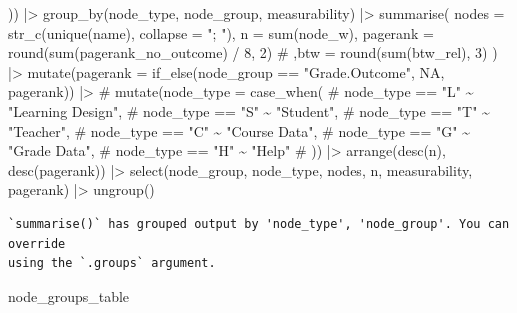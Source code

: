 \documentclass[
  letterpaper,
  DIV=11,
  numbers=noendperiod]{scrartcl}
\newenvironment{Shaded}{\begin{snugshade}}{\end{snugshade}}
\newcommand{\AttributeTok}[1]{\textcolor[rgb]{0.40,0.45,0.13}{#1}}
\newcommand{\CommentTok}[1]{\textcolor[rgb]{0.37,0.37,0.37}{#1}}
\newcommand{\ConstantTok}[1]{\textcolor[rgb]{0.56,0.35,0.01}{#1}}
\newcommand{\DecValTok}[1]{\textcolor[rgb]{0.68,0.00,0.00}{#1}}
\newcommand{\FunctionTok}[1]{\textcolor[rgb]{0.28,0.35,0.67}{#1}}
\newcommand{\NormalTok}[1]{\textcolor[rgb]{0.00,0.23,0.31}{#1}}
\newcommand{\SpecialCharTok}[1]{\textcolor[rgb]{0.37,0.37,0.37}{#1}}
\newcommand{\StringTok}[1]{\textcolor[rgb]{0.13,0.47,0.30}{#1}}
\begin{document}
\begin{Shaded}
\begin{Highlighting}[]
\NormalTok{    )) }\SpecialCharTok{|\textgreater{}} 
    \FunctionTok{group\_by}\NormalTok{(node\_type, node\_group, measurability) }\SpecialCharTok{|\textgreater{}}
    \FunctionTok{summarise}\NormalTok{(}
        \AttributeTok{nodes =} \FunctionTok{str\_c}\NormalTok{(}\FunctionTok{unique}\NormalTok{(name), }\AttributeTok{collapse =} \StringTok{"; "}\NormalTok{),}
        \AttributeTok{n =} \FunctionTok{sum}\NormalTok{(node\_w),}
        \AttributeTok{pagerank =} \FunctionTok{round}\NormalTok{(}\FunctionTok{sum}\NormalTok{(pagerank\_no\_outcome) }\SpecialCharTok{/} \DecValTok{8}\NormalTok{, }\DecValTok{2}\NormalTok{)}
        \CommentTok{\# ,btw = round(sum(btw\_rel), 3)}
\NormalTok{    ) }\SpecialCharTok{|\textgreater{}} 
    \FunctionTok{mutate}\NormalTok{(}\AttributeTok{pagerank =} \FunctionTok{if\_else}\NormalTok{(node\_group }\SpecialCharTok{==} \StringTok{"Grade.Outcome"}\NormalTok{, }\ConstantTok{NA}\NormalTok{, pagerank)) }\SpecialCharTok{|\textgreater{}} 
    \CommentTok{\# mutate(node\_type = case\_when(}
    \CommentTok{\#     node\_type == "L" \textasciitilde{} "Learning Design",}
    \CommentTok{\#     node\_type == "S" \textasciitilde{} "Student",}
    \CommentTok{\#     node\_type == "T" \textasciitilde{} "Teacher",}
    \CommentTok{\#     node\_type == "C" \textasciitilde{} "Course Data",}
    \CommentTok{\#     node\_type == "G" \textasciitilde{} "Grade Data",}
    \CommentTok{\#     node\_type == "H" \textasciitilde{} "Help"}
    \CommentTok{\# )) |\textgreater{} }
    \FunctionTok{arrange}\NormalTok{(}\FunctionTok{desc}\NormalTok{(n), }\FunctionTok{desc}\NormalTok{(pagerank)) }\SpecialCharTok{|\textgreater{}} 
    \FunctionTok{select}\NormalTok{(node\_group, node\_type, nodes, n, measurability, pagerank) }\SpecialCharTok{|\textgreater{}} 
    \FunctionTok{ungroup}\NormalTok{()}
\end{Highlighting}
\end{Shaded}

\begin{verbatim}
`summarise()` has grouped output by 'node_type', 'node_group'. You can override
using the `.groups` argument.
\end{verbatim}

\begin{Shaded}
\begin{Highlighting}[]
\NormalTok{node\_groups\_table}
\end{Highlighting}
\end{Shaded}
\end{document}

